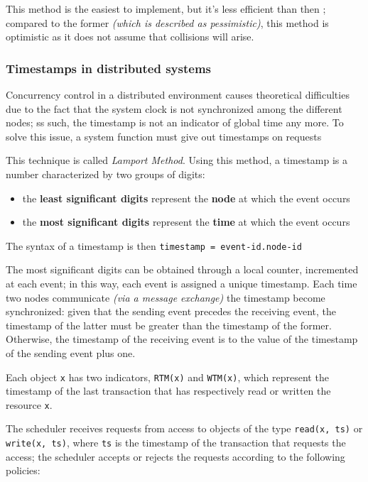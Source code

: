 \documentclass[english]{article}
\begin{document}
\bigskip
This method is the easiest to implement, but it's less efficient than then \TPL;
compared to the former \textit{(which is described as pessimistic)}, this method is optimistic as it does not assume that collisions will arise.

\subsubsection{Timestamps in distributed systems}

Concurrency control in a distributed environment causes theoretical difficulties due to the fact that the system clock is not synchronized among the different nodes;
ss such, the timestamp is not an indicator of global time any more.
To solve this issue, a system function must give out timestamps on requests

This technique is called \textit{Lamport Method}.
Using this method, a timestamp is a number characterized by two groups of digits:

\begin{itemize}
  \item the \textbf{least significant digits} represent the \textbf{node} at which the event occurs
  \item the \textbf{most significant digits} represent the \textbf{time} at which the event occurs
\end{itemize}

The syntax of a timestamp is then \texttt{timestamp = event-id.node-id}

\bigskip
The most significant digits can be obtained through a local counter, incremented at each event; in this way, each event is assigned a unique timestamp.
Each time two nodes communicate \textit{(via a message exchange)} the timestamp become synchronized: given that the sending event precedes the receiving event, the timestamp of the latter must be greater than the timestamp of the former.
Otherwise, the timestamp of the receiving event is  to the value of the timestamp of the sending event plus one.

\bigskip
Each object \texttt{x} has two indicators, \texttt{RTM(x)} and \texttt{WTM(x)}, which represent the timestamp of the last transaction that has respectively read or written the resource \texttt{x}.

The scheduler receives requests from access to objects of the type \texttt{read(x, ts)} or \texttt{write(x, ts)}, where \texttt{ts} is the timestamp of the transaction that requests the access; the scheduler accepts or rejects the requests according to the following policies:
\end{document}
